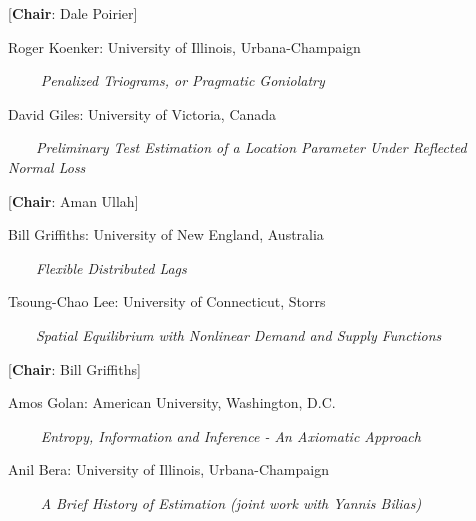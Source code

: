 
  [{\bf Chair}: Dale Poirier]

Roger Koenker:  University  of Illinois, Urbana-Champaign

$\qquad$ {\em Penalized Triograms, or Pragmatic Goniolatry}

David Giles:  University  of Victoria, Canada

$\qquad ${\em Preliminary Test Estimation of a Location Parameter Under Reflected Normal Loss}

\begin{center}
\end{center}

  [{\bf Chair}: Aman Ullah]

Bill Griffiths:  University  of New England, Australia

$\qquad ${\em Flexible Distributed Lags}
 
Tsoung-Chao  Lee: University of Connecticut, Storrs

$\qquad ${\em Spatial Equilibrium with Nonlinear Demand and Supply Functions}
 

[{\bf Chair}: Bill Griffiths]

Amos Golan:  American University, Washington, D.C.

$\qquad$ {\em Entropy, Information and Inference - An Axiomatic Approach}

Anil Bera: University  of Illinois, Urbana-Champaign

$\qquad $ {\em A Brief History of Estimation (joint work with Yannis Bilias)}



 







